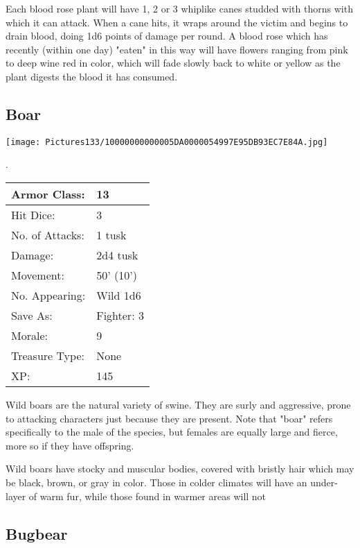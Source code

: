 \documentclass[a4paper,twoside,openany,10pt]{book}
\begin{document}
\begin{multicols}{2}
Each blood rose plant will have 1, 2 or 3 whiplike canes studded with thorns with which it can attack. When a cane hits, it wraps around the victim and begins to drain blood, doing 1d6 points of damage per round. A blood rose which has recently (within one day) "eaten" in this way will have flowers ranging from pink to deep wine red in color, which will fade slowly back to white or yellow as the plant digests the blood it has consumed.

\subsection*{Boar}\label{boar}


\begin{center}
	\texttt{[image: Pictures133/10000000000005DA0000054997E95DB93EC7E84A.jpg]}
\end{center}.

\begin{center}
	\begin{tabularx}{0.48\textwidth}{@{}lX@{}}
Armor Class: & 13 \\\hline
Hit Dice: & 3 \\\hline
No. of Attacks: & 1 tusk \\\hline
Damage: & 2d4 tusk \\\hline
Movement: & 50' (10') \\\hline
No. Appearing: & Wild 1d6 \\\hline
Save As: & Fighter: 3 \\\hline
Morale: & 9 \\\hline
Treasure Type: & None \\\hline
XP: & 145 \\\hline
\end{tabularx}\medskip

\end{center}
Wild
boars are the natural variety of swine. They are surly and aggressive, prone to attacking characters just because they are present. Note that "boar" refers specifically to the male of the species, but females are equally large and fierce, more so if they have offspring. 

Wild boars have stocky and muscular bodies, covered with bristly hair which may be black, brown, or gray in color. Those in colder climates will have an under-layer of warm fur, while those found in warmer areas will not

\subsection*{Bugbear}\label{bugbear}


\end{multicols}
\end{document}
